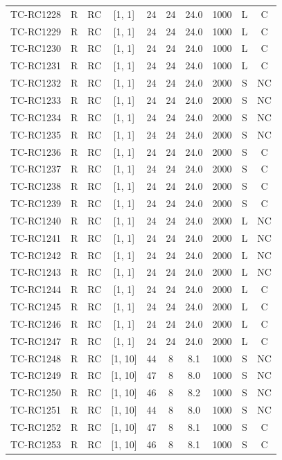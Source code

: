 \begin{longtable}{lccccccccc}
TC-RC1228 & R & RC & [1, 1] & 24 & 24 & 24.0 & 1000 & L & C \\
TC-RC1229 & R & RC & [1, 1] & 24 & 24 & 24.0 & 1000 & L & C \\
TC-RC1230 & R & RC & [1, 1] & 24 & 24 & 24.0 & 1000 & L & C \\
TC-RC1231 & R & RC & [1, 1] & 24 & 24 & 24.0 & 1000 & L & C \\
TC-RC1232 & R & RC & [1, 1] & 24 & 24 & 24.0 & 2000 & S & NC \\
TC-RC1233 & R & RC & [1, 1] & 24 & 24 & 24.0 & 2000 & S & NC \\
TC-RC1234 & R & RC & [1, 1] & 24 & 24 & 24.0 & 2000 & S & NC \\
TC-RC1235 & R & RC & [1, 1] & 24 & 24 & 24.0 & 2000 & S & NC \\
TC-RC1236 & R & RC & [1, 1] & 24 & 24 & 24.0 & 2000 & S & C \\
TC-RC1237 & R & RC & [1, 1] & 24 & 24 & 24.0 & 2000 & S & C \\
TC-RC1238 & R & RC & [1, 1] & 24 & 24 & 24.0 & 2000 & S & C \\
TC-RC1239 & R & RC & [1, 1] & 24 & 24 & 24.0 & 2000 & S & C \\
TC-RC1240 & R & RC & [1, 1] & 24 & 24 & 24.0 & 2000 & L & NC \\
TC-RC1241 & R & RC & [1, 1] & 24 & 24 & 24.0 & 2000 & L & NC \\
TC-RC1242 & R & RC & [1, 1] & 24 & 24 & 24.0 & 2000 & L & NC \\
TC-RC1243 & R & RC & [1, 1] & 24 & 24 & 24.0 & 2000 & L & NC \\
TC-RC1244 & R & RC & [1, 1] & 24 & 24 & 24.0 & 2000 & L & C \\
TC-RC1245 & R & RC & [1, 1] & 24 & 24 & 24.0 & 2000 & L & C \\
TC-RC1246 & R & RC & [1, 1] & 24 & 24 & 24.0 & 2000 & L & C \\
TC-RC1247 & R & RC & [1, 1] & 24 & 24 & 24.0 & 2000 & L & C \\
TC-RC1248 & R & RC & [1, 10] & 44 & 8 & 8.1 & 1000 & S & NC \\
TC-RC1249 & R & RC & [1, 10] & 47 & 8 & 8.0 & 1000 & S & NC \\
TC-RC1250 & R & RC & [1, 10] & 46 & 8 & 8.2 & 1000 & S & NC \\
TC-RC1251 & R & RC & [1, 10] & 44 & 8 & 8.0 & 1000 & S & NC \\
TC-RC1252 & R & RC & [1, 10] & 47 & 8 & 8.1 & 1000 & S & C \\
TC-RC1253 & R & RC & [1, 10] & 46 & 8 & 8.1 & 1000 & S & C \\

\end{longtable}
